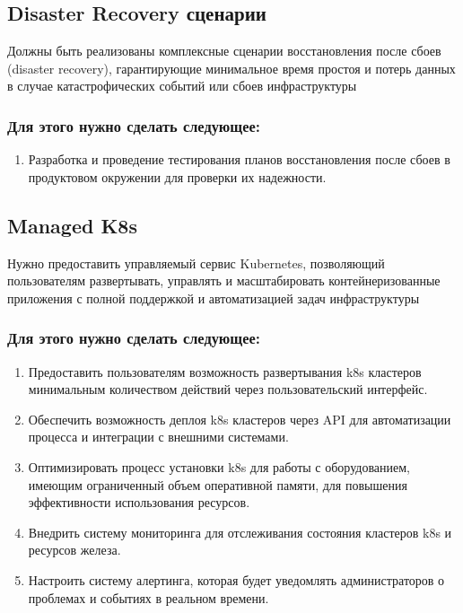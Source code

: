 \documentclass[14pt, a4paper]{extarticle}
\begin{document}
\subsection{Disaster Recovery сценарии}

Должны быть реализованы комплексные сценарии восстановления после сбоев (disaster recovery), гарантирующие минимальное время простоя и потерь данных в случае катастрофических событий или сбоев инфраструктуры

\subsubsection*{Для этого нужно сделать следующее:}

\begin{enumerate}
\item Разработка и проведение тестирования планов восстановления после сбоев в продуктовом окружении для проверки их надежности.
\end{enumerate}

\subsection{Managed K8s}

Нужно предоставить управляемый сервис Kubernetes, позволяющий пользователям развертывать, управлять и масштабировать контейнеризованные приложения с полной поддержкой и автоматизацией задач инфраструктуры

\subsubsection*{Для этого нужно сделать следующее:}

\begin{enumerate}
\item Предоставить пользователям возможность развертывания k8s кластеров минимальным количеством действий через пользовательский интерфейс.
\item Обеспечить возможность деплоя k8s кластеров через API для автоматизации процесса и интеграции с внешними системами.
\item Оптимизировать процесс установки k8s для работы с оборудованием, имеющим ограниченный объем оперативной памяти, для повышения эффективности использования ресурсов.
\item Внедрить систему мониторинга для отслеживания состояния кластеров k8s и ресурсов железа.
\item Настроить систему алертинга, которая будет уведомлять администраторов о проблемах и событиях в реальном времени.
\end{enumerate}
\end{document}
